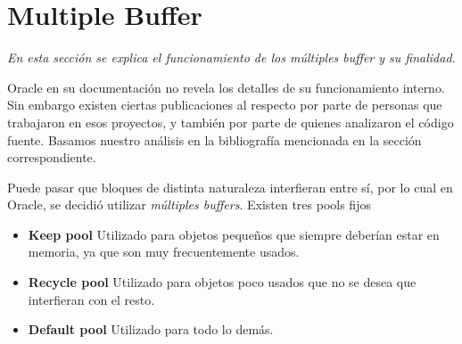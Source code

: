 \section{Multiple Buffer}

\textsl{En esta secci\'on se explica el funcionamiento de los
múltiples buffer y su finalidad.}

\vspace*{0.5cm}

Oracle en su documentaci\'on no revela los detalles de su funcionamiento 
interno. 
Sin embargo existen ciertas publicaciones al respecto por parte de 
personas que trabajaron en esos proyectos, y tambi\'en por parte de 
quienes analizaron el c\'odigo fuente.
Basamos nuestro análisis en la bibliografía mencionada en la 
sección correspondiente.

\vspace*{0.5cm}

Puede pasar que bloques de distinta naturaleza interfieran entre sí, por lo 
cual en Oracle, se decidió utilizar \textit{m\'ultiples buffers}. 
Existen tres pools fijos

\begin{itemize}
  \item \textbf{Keep pool}
    Utilizado para objetos pequeños que siempre deber\'ian estar en memoria, 
    ya que son muy frecuentemente usados.

  \item \textbf{Recycle pool}
    Utilizado para objetos poco usados que no se desea que interfieran 
    con el resto.

  \item \textbf{Default pool} 
    Utilizado para todo lo dem\'as.
\end{itemize}





